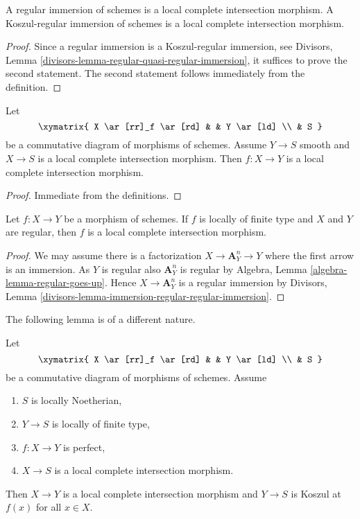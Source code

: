 \begin{lemma}
\label{lemma-regular-immersion-lci}
A regular immersion of schemes is a local complete intersection morphism.
A Koszul-regular immersion of schemes is a local complete intersection
morphism.
\end{lemma}

\begin{proof}
Since a regular immersion is a Koszul-regular immersion, see
Divisors, Lemma \ref{divisors-lemma-regular-quasi-regular-immersion},
it suffices to prove the second statement. The second statement
follows immediately from the definition.
\end{proof}

\begin{lemma}
\label{lemma-lci-permanence}
Let
$$
\xymatrix{
X \ar[rr]_f \ar[rd] & & Y \ar[ld] \\
& S
}
$$
be a commutative diagram of morphisms of schemes. Assume $Y \to S$
smooth and $X \to S$ is a local complete intersection morphism.
Then $f : X \to Y$ is a local complete intersection morphism.
\end{lemma}

\begin{proof}
Immediate from the definitions.
\end{proof}

\begin{lemma}
\label{lemma-morphism-regular-schemes-is-lci}
Let $f : X \to Y$ be a morphism of schemes. If $f$ is locally
of finite type and $X$ and $Y$ are regular, then
$f$ is a local complete intersection morphism.
\end{lemma}

\begin{proof}
We may assume there is a factorization $X \to \mathbf{A}^n_Y \to Y$
where the first arrow is an immersion.
As $Y$ is regular also $\mathbf{A}^n_Y$ is regular by
Algebra, Lemma \ref{algebra-lemma-regular-goes-up}.
Hence $X \to \mathbf{A}^n_Y$ is a regular immersion by
Divisors, Lemma \ref{divisors-lemma-immersion-regular-regular-immersion}.
\end{proof}

\noindent
The following lemma is of a different nature.

\begin{lemma}
\label{lemma-lci-avramov}
Let
$$
\xymatrix{
X \ar[rr]_f \ar[rd] & & Y \ar[ld] \\
& S
}
$$
be a commutative diagram of morphisms of schemes. Assume
\begin{enumerate}
\item $S$ is locally Noetherian,
\item $Y \to S$ is locally of finite type,
\item $f : X \to Y$ is perfect,
\item $X \to S$ is a local complete intersection morphism.
\end{enumerate}
Then $X \to Y$ is a local complete intersection morphism
and $Y \to S$ is Koszul at $f(x)$ for all $x \in X$.
\end{lemma}

